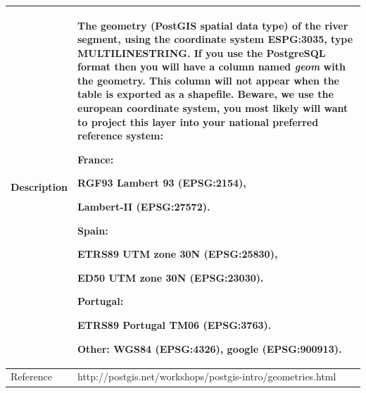 \documentclass[pdftex,12pt,a4paper,svgnames]{report}\usepackage[]{graphicx}\usepackage[]{color}
\begin{document}
\begin{minipage}[c]{\textwidth}
\begin{tabular}{p{3cm}p{12cm}}
\toprule  
Description & The geometry (PostGIS spatial data type) of the river segment, using the coordinate system ESPG:3035, type MULTILINESTRING. If you use the PostgreSQL format then you will have a column named \textit{geom} with the geometry. This column will not appear when the table is exported as a shapefile. Beware, we use the european coordinate system, you most likely will want to project this layer into your national preferred reference system: \hfill

France: \hfill

RGF93 Lambert 93 (EPSG:2154), \hfill 

Lambert-II (EPSG:27572). \hfill

Spain: \hfill 

ETRS89 UTM zone 30N (EPSG:25830), \hfill 

ED50 UTM zone 30N (EPSG:23030). \hfill

Portugal: \hfill 

ETRS89 Portugal TM06 (EPSG:3763). \hfill

Other: WGS84 (EPSG:4326), google (EPSG:900913).\\
\midrule  
Reference & http://postgis.net/workshops/postgis-intro/geometries.html\\
\bottomrule 
\end{tabular} 
\end{minipage} 
\end{document}
